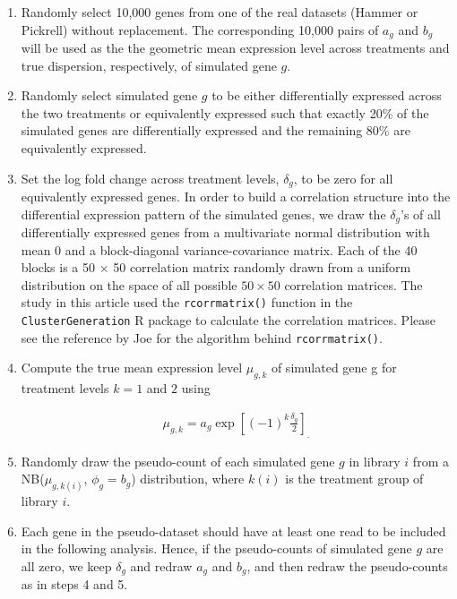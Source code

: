 \documentclass[10pt]{article}
\begin{document}
\begin{enumerate}
\item Randomly select 10,000 genes from one of the real datasets (Hammer or Pickrell) without replacement. The corresponding 10,000 pairs of $a_g$ and $b_g$ will be used as the the geometric mean expression level across treatments and true dispersion, respectively, of simulated gene $g$.
\item Randomly select simulated gene $g$ to be either differentially expressed 
across the two treatments or equivalently expressed 
 such that exactly 20\% of the simulated genes are differentially expressed 
 and the remaining 80\% are equivalently expressed. 
\item Set the log fold change across treatment levels, $\delta_g$, to be zero for all equivalently expressed  genes. In order to build a correlation structure into the differential expression pattern of the simulated genes, we draw the $\delta_g$'s of all differentially expressed genes from a multivariate normal distribution with mean 0 and a block-diagonal variance-covariance matrix. Each of the 40 blocks is a 50 $\times$ 50 correlation matrix randomly drawn from a uniform distribution on the space of all possible $50 \times 50$ correlation matrices. The study in this article used the {\tt rcorrmatrix()} function in the {\tt ClusterGeneration} R package to calculate the correlation matrices. Please see the reference by Joe \cite{joe} for the algorithm behind {\tt rcorrmatrix()}.

\item Compute the true mean expression level $\mu_{g, k}$ of simulated gene g for treatment levels $k = 1$ and $2$ using

\begin{align*}
\mu_{g, k} = a_g \exp \left [ (-1)^k \frac{\delta_g}{2} \right ]_. 
\end{align*}

\item Randomly draw the pseudo-count of each simulated gene $g$ in library $i$ from a NB($\mu_{g, k(i)}$, ${\phi}_{g} = b_g$) distribution, where $k(i)$ is the treatment group of library $i$.
\item Each gene in the pseudo-dataset should have at least one read to be included in the following analysis. Hence, if the pseudo-counts of simulated gene $g$ are all zero, we keep $\delta_g$ and redraw $a_g$ and $b_g$, and then redraw the pseudo-counts as in steps 4 and 5.
\end{enumerate}
\end{document}
